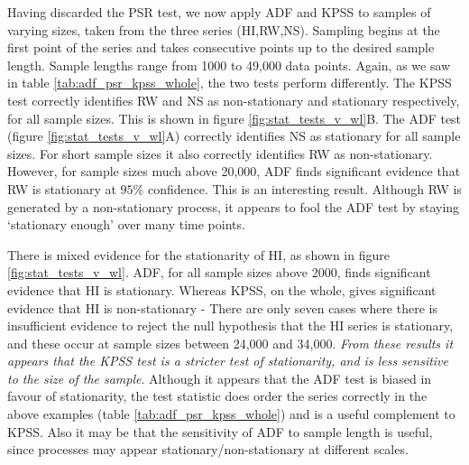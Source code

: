 Having discarded the PSR test, we now apply ADF and KPSS to samples of varying sizes, taken from the three series (HI,RW,NS). Sampling begins at the first point of the series and takes consecutive points up to the desired sample length. Sample lengths range from 1000 to 49,000 data points. Again, as we saw in table \ref{tab:adf_psr_kpss_whole}, the two tests perform differently. The KPSS test correctly identifies RW and NS as non-stationary and stationary respectively, for all sample sizes. This is shown in figure \ref{fig:stat_tests_v_wl}B. The ADF test (figure \ref{fig:stat_tests_v_wl}A) correctly identifies NS as stationary for all sample sizes.  For short sample sizes it also correctly identifies RW as non-stationary. However, for sample sizes much above 20,000, ADF finds significant evidence that RW is stationary at $95\%$ confidence. This is an interesting result. Although RW is generated by a non-stationary process, it appears to fool the ADF test by staying `stationary enough' over many time points. 
  
There is mixed evidence for the stationarity of HI, as shown in figure \ref{fig:stat_tests_v_wl}. ADF, for all sample sizes above 2000, finds significant evidence that HI is stationary. Whereas KPSS, on the whole, gives significant evidence that HI is non-stationary - There are only seven cases where there is insufficient evidence to reject the null hypothesis that the HI series is stationary, and these occur at sample sizes between 24,000 and 34,000. \emph{From these results it appears that the KPSS test is a stricter test of stationarity, and is less sensitive to the size of the sample}. Although it appears that the ADF test is biased in favour of stationarity, the test statistic does order the series correctly in the above examples (table \ref{tab:adf_psr_kpss_whole}) and is a useful complement to KPSS. Also it may be that the sensitivity of ADF to sample length is useful, since processes may appear stationary/non-stationary at different scales. 

